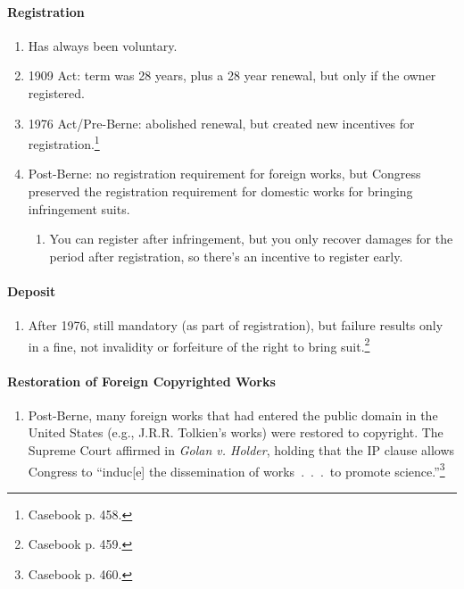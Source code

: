\paragraph{Registration}

\begin{enumerate}
    \item Has always been voluntary.
    \item 1909 Act: term was 28 years, plus a 28 year renewal, but only if the 
    owner registered.
    \item 1976 Act/Pre-Berne: abolished renewal, but created new incentives 
    for registration.\footnote{Casebook p. 458.}
    \item Post-Berne: no registration requirement for foreign works, but 
    Congress preserved the registration requirement for domestic works for 
    bringing infringement suits.
    \begin{enumerate}
        \item You can register after infringement, but you only recover 
        damages for the period after registration, so there's an incentive to 
        register early.
    \end{enumerate}
\end{enumerate}

\paragraph{Deposit}

\begin{enumerate}
    \item After 1976, still mandatory (as part of registration), but failure 
    results only in a fine, not invalidity or forfeiture of the right to bring 
    suit.\footnote{Casebook p.  459.}
\end{enumerate}

\paragraph{Restoration of Foreign Copyrighted Works}

\begin{enumerate}
    \item Post-Berne, many foreign works that had entered the public domain in 
    the United States (e.g., J.R.R. Tolkien's works) were restored to 
    copyright. The Supreme Court affirmed in \emph{Golan v. Holder}, holding 
    that the IP clause allows Congress to ``induc[e] the dissemination of 
    works~.~.~.~to promote science.''\footnote{Casebook p. 460.}
\end{enumerate}

